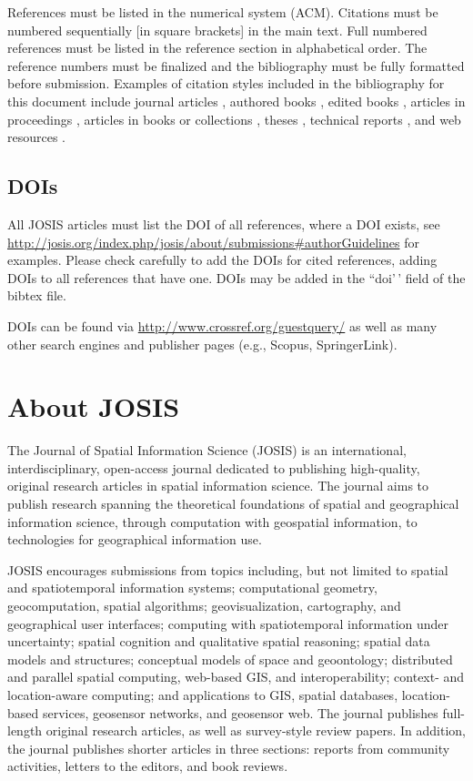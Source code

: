 \documentclass{josis}
\begin{document}
References must be listed in the numerical system (ACM). Citations must
be numbered sequentially {[}in square brackets{]} in the main text. Full
numbered references must be listed in the reference section in
alphabetical order. The reference numbers must be finalized and the
bibliography must be fully formatted before submission. Examples of
citation styles included in the bibliography for this document include
journal articles \cite{overEtAl2010,arkin}, authored books
\cite{bailey}, edited books \cite{miller09.BOOK}, articles in
proceedings \cite{champion11}, articles in books or collections
\cite{Grosso12}, theses \cite{ruas99}, technical reports
\cite{blasertr}, and web resources \cite{web}.

\subsection{DOIs}

All JOSIS articles must list the DOI of all references, where a DOI
exists, see
\url{http://josis.org/index.php/josis/about/submissions#authorGuidelines}
for examples. Please check carefully to add the DOIs for cited
references, adding DOIs to all references that have one. DOIs may be
added in the ``doi'\,' field of the bibtex file.

DOIs can be found via \url{http://www.crossref.org/guestquery/} as well
as many other search engines and publisher pages (e.g., Scopus,
SpringerLink).

\section{About JOSIS}

The Journal of Spatial Information Science (JOSIS) is an international,
interdisciplinary, open-access journal dedicated to publishing
high-quality, original research articles in spatial information science.
The journal aims to publish research spanning the theoretical
foundations of spatial and geographical information science, through
computation with geospatial information, to technologies for
geographical information use.

JOSIS encourages submissions from topics including, but not limited to
spatial and spatiotemporal information systems; computational geometry,
geocomputation, spatial algorithms; geovisualization, cartography, and
geographical user interfaces; computing with spatiotemporal information
under uncertainty; spatial cognition and qualitative spatial reasoning;
spatial data models and structures; conceptual models of space and
geoontology; distributed and parallel spatial computing, web-based GIS,
and interoperability; context- and location-aware computing; and
applications to GIS, spatial databases, location-based services,
geosensor networks, and geosensor web. The journal publishes full-length
original research articles, as well as survey-style review papers. In
addition, the journal publishes shorter articles in three sections:
reports from community activities, letters to the editors, and book
reviews.
\end{document}
